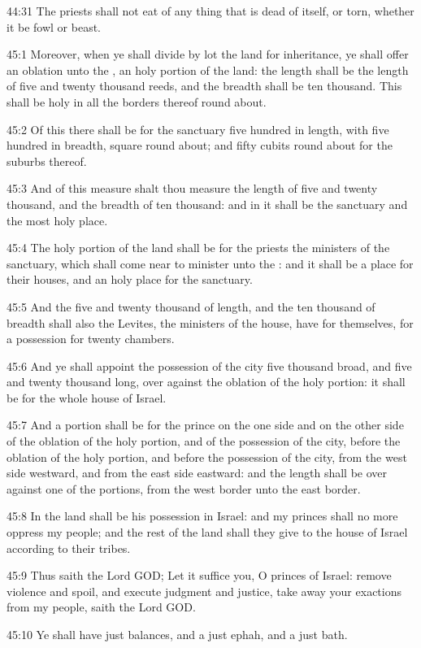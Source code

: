 44:31 The priests shall not eat of any thing that is dead of itself, or torn, whether it be fowl or beast.

45:1 Moreover, when ye shall divide by lot the land for inheritance, ye shall offer an oblation unto the \LORD, an holy portion of the land: the length shall be the length of five and twenty thousand reeds, and the breadth shall be ten thousand. This shall be holy in all the borders thereof round about.

45:2 Of this there shall be for the sanctuary five hundred in length, with five hundred in breadth, square round about; and fifty cubits round about for the suburbs thereof.

45:3 And of this measure shalt thou measure the length of five and twenty thousand, and the breadth of ten thousand: and in it shall be the sanctuary and the most holy place.

45:4 The holy portion of the land shall be for the priests the ministers of the sanctuary, which shall come near to minister unto the \LORD: and it shall be a place for their houses, and an holy place for the sanctuary.

45:5 And the five and twenty thousand of length, and the ten thousand of breadth shall also the Levites, the ministers of the house, have for themselves, for a possession for twenty chambers.

45:6 And ye shall appoint the possession of the city five thousand broad, and five and twenty thousand long, over against the oblation of the holy portion: it shall be for the whole house of Israel.

45:7 And a portion shall be for the prince on the one side and on the other side of the oblation of the holy portion, and of the possession of the city, before the oblation of the holy portion, and before the possession of the city, from the west side westward, and from the east side eastward: and the length shall be over against one of the portions, from the west border unto the east border.

45:8 In the land shall be his possession in Israel: and my princes shall no more oppress my people; and the rest of the land shall they give to the house of Israel according to their tribes.

45:9 Thus saith the Lord GOD; Let it suffice you, O princes of Israel: remove violence and spoil, and execute judgment and justice, take away your exactions from my people, saith the Lord GOD.

45:10 Ye shall have just balances, and a just ephah, and a just bath.

